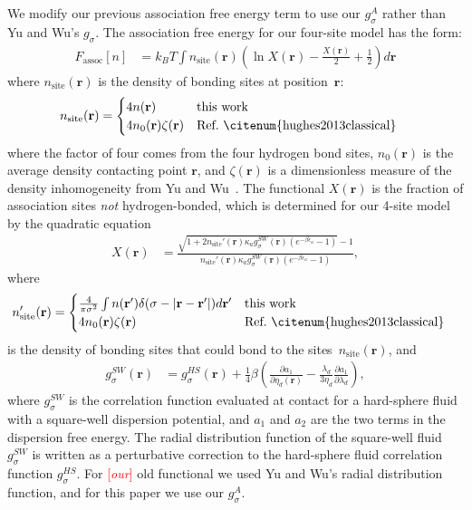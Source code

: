 \documentclass[twocolumn,amsmath,amssymb,prl]{revtex4-1}
\newcommand{\rr}{\textbf{r}}
\newcommand{\xx}{\textbf{r}}
\newcommand\etadisp{\ensuremath{\eta_\textit{d}}}
\newcommand\epsilonassoc{\ensuremath{\epsilon_\textit{a}}}
\newcommand\kappaassoc{\ensuremath{\kappa_\textit{a}}}
\newcommand\lambdadisp{\ensuremath{\lambda_\textit{d}}}
\newcommand{\fixme}[1]{\textcolor{red}{[\emph{#1}]}}
\begin{document}
We modify our previous association free energy term to use our
$g_{\sigma}^\textit{A}$ rather than Yu and Wu's $g_\sigma$.  The
association free energy for our four-site model has the form:
\begin{align}
  F_\text{assoc}[n] &= k_BT \int n_\text{site}(\xx)
  \left(\ln X(\xx) - \frac{X(\xx)}{2} + \frac12\right) d\xx
\end{align}
where $n_\text{site}(\rr)$ is the density of bonding sites at
position~$\rr$:
\begin{align}
  n_\text{site}(\rr) &=
  \begin{cases}
    4 n(\rr) & \text{this work}\\
    4 n_0(\rr) \zeta(\rr) & \text{Ref.~\citenum{hughes2013classical}}
  \end{cases}
\end{align}
where the factor of four comes from the four hydrogen bond sites,
$n_0(\rr)$ is the average density contacting point $\rr$, and
$\zeta(\xx)$ is a dimensionless measure of the density inhomogeneity
from Yu and Wu~\cite{yu2002fmt-dft-inhomogeneous-associating}.  The
functional $X(\rr)$ is the fraction of association sites \emph{not}
hydrogen-bonded, which is determined for our 4-site model by the
quadratic equation
\begin{align}
  X(\xx) &= \frac{\sqrt{1 + 2n_\text{site}'(\rr)
      \kappaassoc g^\textit{SW}_\sigma(\xx)
  \left(e^{-\beta\epsilonassoc} - 1\right)} - 1}
  {n_\text{site}'(\rr)
    \kappaassoc g^\textit{SW}_\sigma(\xx)
  \left(e^{-\beta\epsilonassoc} - 1\right)}, \label{eq:X}
\end{align}
where
\begin{align}
  n_\text{site}'(\rr) &=
  \begin{cases}
    \frac{4}{\pi\sigma^2} \int n(\rr')\delta(\sigma - |\rr-\rr'|) d\rr' & \text{this work}\\
    4 n_0(\rr) \zeta(\rr) & \text{Ref.~\citenum{hughes2013classical}}
  \end{cases} 
\end{align}
is the density of bonding sites that could bond to the sites~$n_\text{site}(\rr)$, and
\begin{align}
  g^\textit{SW}_\sigma(\xx) &= g^\textit{HS}_\sigma(\xx) +
  \frac{1}{4}\beta\left(\frac{\partial a_1}{\partial \etadisp(\xx)} -
  \frac{\lambdadisp}{3 \etadisp}\frac{\partial a_1}{\partial \lambdadisp}\right)\label{eq:gSW},
\end{align}
where $g^\textit{SW}_\sigma$ is the correlation function evaluated at
contact for a hard-sphere fluid with a square-well dispersion
potential, and $a_1$ and $a_2$ are the two terms in the dispersion
free energy.  The radial distribution function of the square-well
fluid $g^\textit{SW}_\sigma$ is written as a perturbative correction
to the hard-sphere fluid correlation function
$g^\textit{HS}_\sigma$. For \fixme{our} old functional we used Yu and Wu's
radial distribution function, and for this paper we use our
$g^\textit{A}_\sigma$.
\end{document}
